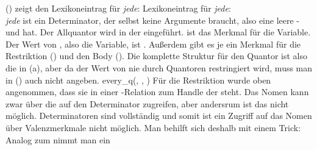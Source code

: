 () zeigt den Lexikoneintrag für \emph{jede}:
\eas
Lexikoneintrag für \emph{jede}:\\
\zs
\emph{jede} ist ein Determinator, der selbst keine Argumente braucht, also eine leere \spr- und
\compsl hat. Der Allquantor wird in der \relsl eingeführt. \argzero ist das Merkmal für die
Variable. Der Wert von \argzero, also die Variable, ist . Außerdem gibt es je ein Merkmal
für die Restriktion (\restr) und den Body (\body). Die komplette Struktur für den Quantor ist also
die in (a), aber da der Wert von \body nie durch Quantoren restringiert wird, muss man \body
in () auch nicht angeben.
\eal
\ex {}
\ex every\_q(, , \etag)
\zl
Für die Restriktion
wurde oben angenommen, dass sie in einer \qeq\vspace{-2pt}\hspace{-.5ex}\hyp Relation zum Handle der
\nbar steht. Das Nomen kann
zwar über die \sprl auf den Determinator zugreifen, aber andersrum ist das nicht
möglich. Determinatoren sind vollständig und somit ist ein Zugriff auf das Nomen über Valenzmerkmale
nicht möglich. Man behilft sich deshalb mit einem Trick: Analog zum \modm nimmt man ein
